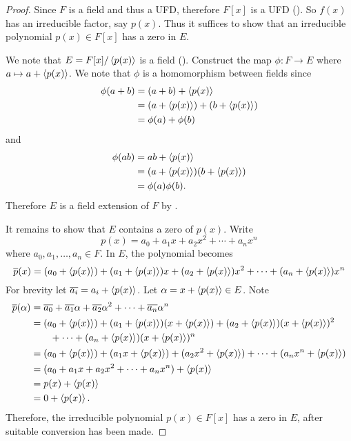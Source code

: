 \begin{proof}
    Since $F$ is a field and thus a UFD, therefore $F[x]$ is a UFD (). So $f(x)$ has an irreducible factor, say $p(x)$. Thus it suffices to show that an irreducible polynomial $p(x) \in F[x]$ has a zero in $E$.

    We note that $E = F[x]/\left\langle p(x)\right\rangle$ is a field (). Construct the map $\phi: F \to E$ where $a \mapsto a + \left\langle p(x)\right\rangle$. We note that $\phi$ is a homomorphism between fields since
    \begin{align*}
        \phi(a+b) &= (a+b) + \left\langle p(x)\right\rangle\\
        &= (a + \left\langle p(x)\right\rangle) + (b + \left\langle p(x)\right\rangle)\\
        &= \phi(a) + \phi(b)
    \end{align*}
    and
    \begin{align*}
        \phi(ab) &= ab + \left\langle p(x)\right\rangle\\
        &= (a+\left\langle p(x)\right\rangle)(b+\left\langle p(x)\right\rangle)\\
        &= \phi(a)\phi(b).
    \end{align*}
    Therefore $E$ is a field extension of $F$ by .

    It remains to show that $E$ contains a zero of $p(x)$. Write
    \[
        p(x) = a_0 + a_1x + a_2x^2 + \cdots + a_nx^n
    \]
    where $a_0, a_1, \dots, a_n \in F$. In $E$, the polynomial becomes
    \[
        \overline{p}(x) = (a_0 + \left\langle p(x)\right\rangle) + (a_1 + \left\langle p(x)\right\rangle)x + (a_2 + \left\langle p(x)\right\rangle)x^2 + \cdots + (a_n + \left\langle p(x)\right\rangle)x^n
    \]
    For brevity let $\overline{a_i} = a_i + \left\langle p(x)\right\rangle$. Let $\alpha = x + \left\langle p(x)\right\rangle \in E$. Note
    \begin{align*}
        \overline{p}(\alpha) &= \overline{a_0} + \overline{a_1}\alpha + \overline{a_2}\alpha^2 + \cdots + \overline{a_n}\alpha^n\\
        &= (a_0 + \left\langle p(x)\right\rangle) + (a_1 + \left\langle p(x)\right\rangle)(x + \left\langle p(x)\right\rangle) + (a_2 + \left\langle p(x)\right\rangle)(x + \left\langle p(x)\right\rangle)^2\\
        &\quad\quad+ \cdots + (a_n + \left\langle p(x)\right\rangle)(x + \left\langle p(x)\right\rangle)^n\\
        &= (a_0 + \left\langle p(x)\right\rangle) + (a_1x + \left\langle p(x)\right\rangle) + (a_2x^2 + \left\langle p(x)\right\rangle) + \cdots + (a_nx^n + \left\langle p(x)\right\rangle)\\
        &= (a_0 + a_1x + a_2x^2 + \cdots + a_nx^n) + \left\langle p(x)\right\rangle\\
        &= p(x) + \left\langle p(x)\right\rangle\\
        &= 0 + \left\langle p(x)\right\rangle.
    \end{align*}
    Therefore, the irreducible polynomial $p(x) \in F[x]$ has a zero in $E$, after suitable conversion has been made.
\end{proof}

